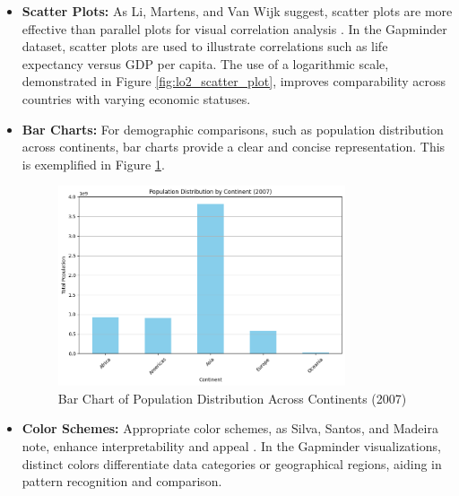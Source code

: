 \begin{itemize}
    \item \textbf{Scatter Plots:} As Li, Martens, and Van Wijk suggest, scatter plots are more effective than parallel plots for visual correlation analysis \cite{liJudgingCorrelationScatterplots2010}. In the Gapminder dataset, scatter plots are used to illustrate correlations such as life expectancy versus GDP per capita. The use of a logarithmic scale, demonstrated in Figure \ref{fig:lo2_scatter_plot}, improves comparability across countries with varying economic statuses.

    \item \textbf{Bar Charts:} For demographic comparisons, such as population distribution across continents, bar charts provide a clear and concise representation. This is exemplified in Figure \ref{fig:lo3_barchart}.

\begin{figure}[h]
    \centering
    \includegraphics[width=0.8\textwidth]{images/plots/lo3_barplot.png}
    \caption{Bar Chart of Population Distribution Across Continents (2007)}
    \label{fig:lo3_barchart}
\end{figure}

    \item \textbf{Color Schemes:} Appropriate color schemes, as Silva, Santos, and Madeira note, enhance interpretability and appeal \cite{silvaUsingColorVisualization2011}. In the Gapminder visualizations, distinct colors differentiate data categories or geographical regions, aiding in pattern recognition and comparison.


\end{itemize}
